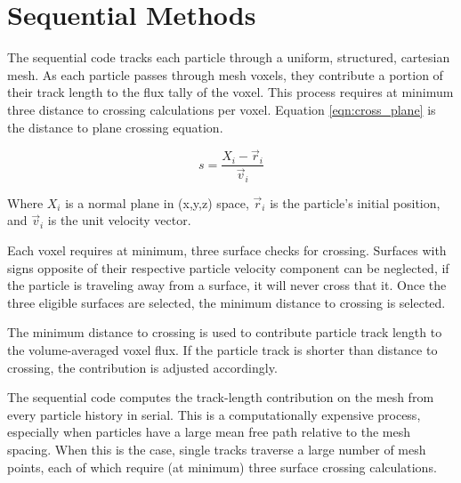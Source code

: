 \section{Sequential Methods}

The sequential code tracks each particle through a uniform, structured,
cartesian mesh. As each particle passes through mesh voxels, they contribute a
portion of their track length to the flux tally of the voxel. This process
requires at minimum three distance to crossing calculations per voxel. Equation
\ref{eqn:cross_plane} is the distance to plane crossing equation.

\begin{equation}
\label{eqn:cross_plane}
s = \frac{X_i - \vec{r}_i}{\vec{v}_i}
\end{equation}

Where $X_i$ is a normal plane in (x,y,z) space, $\vec{r}_i$ is the particle's
initial position, and $\vec{v}_i$ is the unit velocity vector.

Each voxel requires at minimum, three surface checks for crossing. Surfaces with
signs opposite of their respective particle velocity component can be neglected,
if the particle is traveling away from a surface, it will never cross that it.
Once the three eligible surfaces are selected, the minimum distance to crossing
is selected. 

The minimum distance to crossing is used to contribute particle track length to
the volume-averaged voxel flux. If the particle track is shorter than distance
to crossing, the contribution is adjusted accordingly.

The sequential code computes the track-length contribution on the mesh from
every particle history in serial. This is a computationally expensive process,
especially when particles have a large mean free path relative to the mesh
spacing. When this is the case, single tracks traverse a large number of mesh
points, each of which require (at minimum) three surface crossing calculations.


